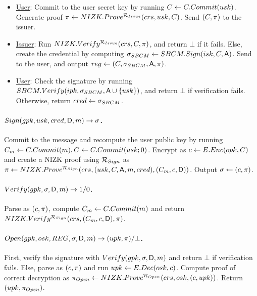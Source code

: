   
\begin{itemize}
\item \underline{User}: Commit to the user secret key by running $C \gets
  C.Commit(usk)$. Generate proof $\pi \gets
  NIZK.Prove^{\mathcal{R}_{Issue}}(crs,usk,C)$. Send $(C,
  \pi)$ to the issuer.
\item \underline{Issuer}: Run $NIZK.Verify^{\mathcal{R}_{Issue}}(crs,
  C,\pi)$, and return $\bot$ if it fails. Else, create the credential
  by computing $\sigma_{SBCM} \gets SBCM.Sign(isk,C,\mathsf{A})$. Send \SBCMsig to the
  user, and output $reg \gets (C,\sigma_{SBCM},\mathsf{A},\pi)$.
\item \underline{User}: Check the signature by running $SBCM.Verify(ipk,
  \sigma_{SBCM},\mathsf{A} \cup \lbrace usk \rbrace)$, and return $\bot$ if
  verification fails. Otherwise, return $cred \gets \sigma_{SBCM}$.
\end{itemize}

\paragraph{$Sign(gpk,usk,cred,\mathsf{D},m) \rightarrow \sigma$.} %
Commit to the message and recompute the user public key by running
$C_{m} \gets C.Commit(m), C \gets C.Commit(usk; 0)$.
Encrypt \Ccom as $c \gets E.Enc(opk,C)$ and create a NIZK proof using
$\mathcal{R}_{Sign}$ as $\pi \gets NIZK.Prove^{\mathcal{R}_{Sign}}
(crs,(usk,C,\mathsf{A},m,cred),
(C_{m},c,\mathsf{D}))$. Output $\sigma \gets (c,\pi)$.

\paragraph{$Verify(gpk,\sigma,\mathsf{D},m) \rightarrow 1/0$.} %
Parse \sig as $(c,\pi)$, compute $C_{m} \gets C.Commit(m)$ and
return $NIZK.Verify^{\mathcal{R}_{Sign}}(crs,(C_{m},c,\mathsf{D}),
\pi)$.

\paragraph{$\Open(\gpk,\osk,\trans,\sig,\DAttrs,\msg)
  \rightarrow (\upk,\oproof)/\bot$.} %
First, verify the signature with $Verify(gpk,\sigma,\mathsf{D},m)$ and
return $\bot$ if verification fails. Else, parse \sig as $(c,\pi)$
and run $upk \gets E.Dec(osk,c)$. Compute proof of correct decryption
as $\pi_{Open} \gets NIZK.Prove^{\mathcal{R}_{Open}}(crs,osk,(c,
upk))$. Return $(upk,\pi_{Open})$.

